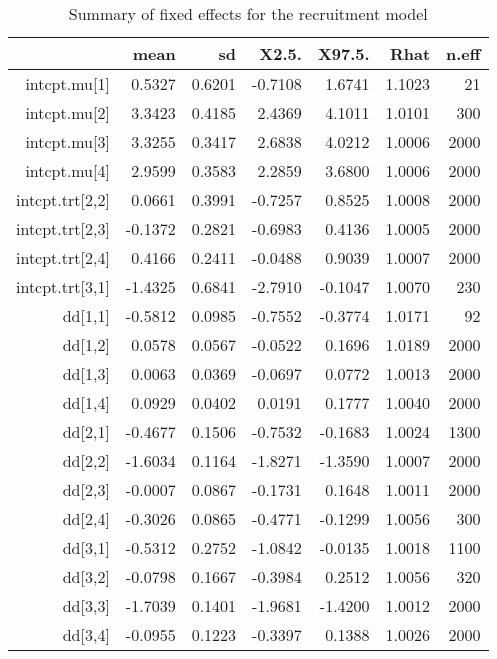 \begin{table}[ht]
\centering
\caption{Summary of fixed effects for the recruitment model} 
\label{table:recruitment}
\begin{tabular}{rrrrrrr}
  \hline
 & mean & sd & X2.5. & X97.5. & Rhat & n.eff \\ 
  \hline
intcpt.mu[1] & 0.5327 & 0.6201 & -0.7108 & 1.6741 & 1.1023 &    21 \\ 
  intcpt.mu[2] & 3.3423 & 0.4185 & 2.4369 & 4.1011 & 1.0101 &   300 \\ 
  intcpt.mu[3] & 3.3255 & 0.3417 & 2.6838 & 4.0212 & 1.0006 &  2000 \\ 
  intcpt.mu[4] & 2.9599 & 0.3583 & 2.2859 & 3.6800 & 1.0006 &  2000 \\ 
  intcpt.trt[2,2] & 0.0661 & 0.3991 & -0.7257 & 0.8525 & 1.0008 &  2000 \\ 
  intcpt.trt[2,3] & -0.1372 & 0.2821 & -0.6983 & 0.4136 & 1.0005 &  2000 \\ 
  intcpt.trt[2,4] & 0.4166 & 0.2411 & -0.0488 & 0.9039 & 1.0007 &  2000 \\ 
  intcpt.trt[3,1] & -1.4325 & 0.6841 & -2.7910 & -0.1047 & 1.0070 &   230 \\ 
  dd[1,1] & -0.5812 & 0.0985 & -0.7552 & -0.3774 & 1.0171 &    92 \\ 
  dd[1,2] & 0.0578 & 0.0567 & -0.0522 & 0.1696 & 1.0189 &  2000 \\ 
  dd[1,3] & 0.0063 & 0.0369 & -0.0697 & 0.0772 & 1.0013 &  2000 \\ 
  dd[1,4] & 0.0929 & 0.0402 & 0.0191 & 0.1777 & 1.0040 &  2000 \\ 
  dd[2,1] & -0.4677 & 0.1506 & -0.7532 & -0.1683 & 1.0024 &  1300 \\ 
  dd[2,2] & -1.6034 & 0.1164 & -1.8271 & -1.3590 & 1.0007 &  2000 \\ 
  dd[2,3] & -0.0007 & 0.0867 & -0.1731 & 0.1648 & 1.0011 &  2000 \\ 
  dd[2,4] & -0.3026 & 0.0865 & -0.4771 & -0.1299 & 1.0056 &   300 \\ 
  dd[3,1] & -0.5312 & 0.2752 & -1.0842 & -0.0135 & 1.0018 &  1100 \\ 
  dd[3,2] & -0.0798 & 0.1667 & -0.3984 & 0.2512 & 1.0056 &   320 \\ 
  dd[3,3] & -1.7039 & 0.1401 & -1.9681 & -1.4200 & 1.0012 &  2000 \\ 
  dd[3,4] & -0.0955 & 0.1223 & -0.3397 & 0.1388 & 1.0026 &  2000 \\ 

\end{tabular}
\end{table}
